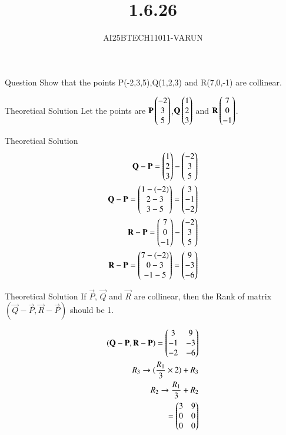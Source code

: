 \documentclass{beamer}
\title %
{1.6.26}
\author %
{AI25BTECH11011-VARUN}
\begin{document}
\frame{\titlepage}
\begin{frame}{Question}
Show that the points P(-2,3,5),Q(1,2,3) and R(7,0,-1) are collinear.
\end{frame}

\begin{frame}{Theoretical Solution}
Let the points are $\mathbf{P}\begin{pmatrix}-2\\3\\5\end{pmatrix}$,$\mathbf{Q}\begin{pmatrix}1\\2\\3\end{pmatrix}$ and $\mathbf{R}\begin{pmatrix}7\\0\\-1\end{pmatrix}$.
\end{frame}

\begin{frame}{Theoretical Solution}
\begin{align}
\mathbf{Q} - \mathbf{P} = \begin{pmatrix}1\\2\\3\end{pmatrix} - \begin{pmatrix}-2\\3\\5\end{pmatrix}  \\
\mathbf{Q} - \mathbf{P} = \begin{pmatrix}1-(-2)\\2-3\\3-5\end{pmatrix} = \begin{pmatrix}3\\-1\\-2\end{pmatrix}  \\
\mathbf{R} - \mathbf{P} = \begin{pmatrix}7\\0\\-1\end{pmatrix} - \begin{pmatrix}-2\\3\\5\end{pmatrix}  \\
\mathbf{R} - \mathbf{P} = \begin{pmatrix}7-(-2)\\0-3\\-1-5\end{pmatrix} = \begin{pmatrix}9\\-3\\-6\end{pmatrix}  \\
\end{align}
\end{frame}

\begin{frame}{Theoretical Solution}
If $\vec{P}$, $\vec{Q}$ and $\vec{R}$ are collinear, then the Rank of matrix $(\vec{Q} - \vec{P},\vec{R} - \vec{P})$ should be 1.

\begin{align}
(\mathbf{Q} - \mathbf{P},\mathbf{R} - \mathbf{P}) = \begin{pmatrix}3&9\\-1&-3\\-2&-6\end{pmatrix}  \\ 
R_3 \rightarrow (\frac{R_1}{3}\times2) + R_3  \\
R_2 \rightarrow \frac{R_1}{3} + R_2  \\
= \begin{pmatrix}3&9\\0&0\\0&0\end{pmatrix}  \\
\end{align}
\end{frame}
\end{document}

